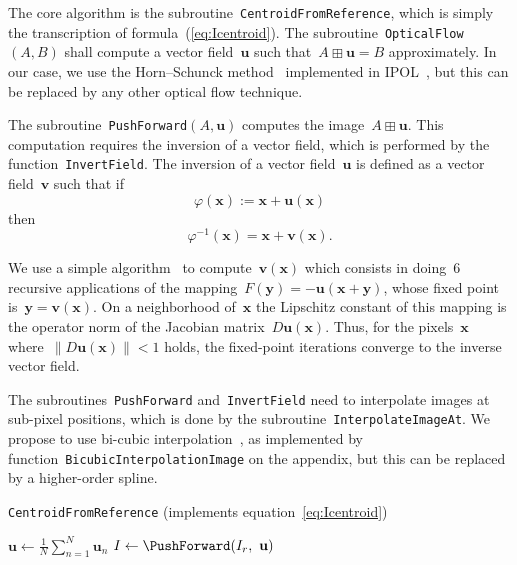 \documentclass{ipol}
\def\x{\mathbf{x}}
\def\y{\mathbf{y}}
\def\u{\mathbf{u}}
\def\v{\mathbf{v}}
\begin{document}
The core algorithm is the subroutine~\texttt{CentroidFromReference}, which is
simply the transcription of formula~(\ref{eq:Icentroid}).
The subroutine~\texttt{OpticalFlow}$(A,B)$ shall compute a vector field~$\u$
such that~$A\boxplus\u=B$ approximately.  In our case, we use the
Horn--Schunck method~\cite{horn1981determining} implemented in
IPOL~\cite{HSipol}, but this can be replaced by any other optical flow
technique.

The subroutine~\texttt{PushForward}$(A,\u)$ computes the image~$A\boxplus\u$.
This computation requires the inversion of a vector field, which is
performed by the function~\texttt{InvertField}.  The inversion of a vector
field~$\u$ is defined as a vector field~$\v$ such that if
\[
\varphi(\x):=\x+\u(\x)
\]
then
\[
\varphi^{-1}(\x)=\x+\v(\x).
\]
\par
We use a simple algorithm~\cite{chen2008} to compute~$\v(\x)$ which
consists in doing~$6$
recursive applications of the mapping~$F(\y)=-\u(\x+\y)$, whose fixed point
is~$\y=\v(\x)$.
On a neighborhood of~$\x$ the Lipschitz constant of this mapping is the operator norm of
the Jacobian matrix~$D\u(\x)$.
Thus, for the pixels~$\x$ where~$\|D\u(\x)\|<1$ holds,
%
the fixed-point iterations converge to the inverse vector field.

The subroutines~\texttt{PushForward} and~\texttt{InvertField} need to
interpolate images at sub-pixel positions, which is done by the
subroutine~\texttt{InterpolateImageAt}.  We propose to use bi-cubic
interpolation~\cite{keys1981cubic}, as implemented by
function~\texttt{BicubicInterpolationImage} on the appendix, but this can be
replaced by a higher-order spline.

\begin{algorithm}[H]
	\caption{\texttt{CentroidFromReference}
	(implements equation~\ref{eq:Icentroid})}
	\label{alg:centroid}
	\dontprintsemicolon

	\BlankLine
	\For{$n=1,\ldots,N$}{
		$\u_n\leftarrow\OpticalFlow(I_r,\ I_n)$\;
	}
	\BlankLine
	$\u\leftarrow\displaystyle\frac{1}{N}\sum_{n=1}^N\u_n$\;
	\BlankLine
	$I\leftarrow\PushForward(I_r,\ \u)$\;
\end{algorithm}
\end{document}
